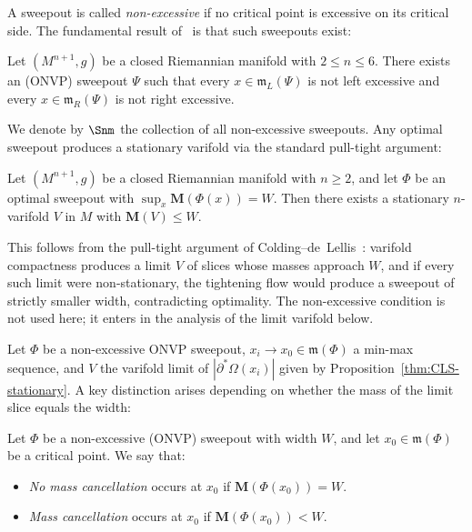 A sweepout is called \emph{non-excessive} if no critical point is excessive on its critical side. The fundamental result of~\cite{CLS22} is that such sweepouts exist:

\begin{theorem}\label{thm:non-excessive-existence}
Let $(M^{n+1},g)$ be a closed Riemannian manifold with $2\leq n\leq 6$. There exists an (ONVP) sweepout $\Psi$ such that every $x\in \mathfrak{m}_L(\Psi)$ is not left excessive and every $x \in \mathfrak{m}_R(\Psi)$ is not right excessive.
\end{theorem}

We denote by $\Snm$ the collection of all non-excessive sweepouts. Any optimal sweepout produces a stationary varifold via the standard pull-tight argument:

\begin{proposition}\label{thm:CLS-stationary}
Let $(M^{n+1},g)$ be a closed Riemannian manifold with $n \geq 2$, and let $\Phi$ be an optimal sweepout with $\sup_x \mathbf{M}(\Phi(x)) = W$. Then there exists a stationary $n$-varifold $V$ in $M$ with $\mathbf{M}(V) \leq W$.
\end{proposition}

This follows from the pull-tight argument of Colding--de~Lellis~\cite{CL03}: varifold compactness produces a limit $V$ of slices whose masses approach $W$, and if every such limit were non-stationary, the tightening flow would produce a sweepout of strictly smaller width, contradicting optimality. The non-excessive condition is not used here; it enters in the analysis of the limit varifold below.

Let $\Phi$ be a non-excessive ONVP sweepout, $x_i \to x_0 \in \mathfrak{m}(\Phi)$ a min-max sequence, and $V$ the varifold limit of $|\partial^*\Omega(x_i)|$ given by Proposition~\ref{thm:CLS-stationary}. A key distinction arises depending on whether the mass of the limit slice equals the width:

\begin{definition}\label{def:mass-cancellation}
Let $\Phi$ be a non-excessive (ONVP) sweepout with width $W$, and let $x_0 \in \mathfrak{m}(\Phi)$ be a critical point. We say that:
\begin{itemize}
    \item \emph{No mass cancellation} occurs at $x_0$ if $\mathbf{M}(\Phi(x_0)) = W$.
    \item \emph{Mass cancellation} occurs at $x_0$ if $\mathbf{M}(\Phi(x_0)) < W$.
\end{itemize}
\end{definition}

